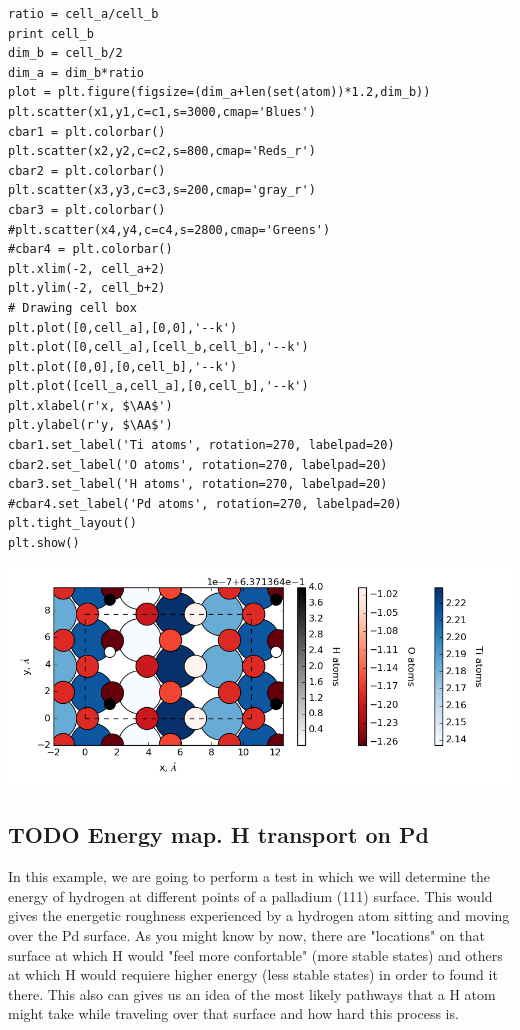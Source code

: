 \documentclass[11pt]{article}
\begin{document}
\begin{verbatim}
ratio = cell_a/cell_b
print cell_b
dim_b = cell_b/2
dim_a = dim_b*ratio
plot = plt.figure(figsize=(dim_a+len(set(atom))*1.2,dim_b))
plt.scatter(x1,y1,c=c1,s=3000,cmap='Blues')
cbar1 = plt.colorbar()
plt.scatter(x2,y2,c=c2,s=800,cmap='Reds_r')
cbar2 = plt.colorbar()
plt.scatter(x3,y3,c=c3,s=200,cmap='gray_r')
cbar3 = plt.colorbar()
#plt.scatter(x4,y4,c=c4,s=2800,cmap='Greens')
#cbar4 = plt.colorbar()
plt.xlim(-2, cell_a+2)
plt.ylim(-2, cell_b+2)
# Drawing cell box
plt.plot([0,cell_a],[0,0],'--k')
plt.plot([0,cell_a],[cell_b,cell_b],'--k')
plt.plot([0,0],[0,cell_b],'--k')
plt.plot([cell_a,cell_a],[0,cell_b],'--k')
plt.xlabel(r'x, $\AA$')
plt.ylabel(r'y, $\AA$')
cbar1.set_label('Ti atoms', rotation=270, labelpad=20)
cbar2.set_label('O atoms', rotation=270, labelpad=20)
cbar3.set_label('H atoms', rotation=270, labelpad=20)
#cbar4.set_label('Pd atoms', rotation=270, labelpad=20)
plt.tight_layout()
plt.show()
\end{verbatim}



\begin{center}
\includegraphics[width=.9\linewidth]{./figures/BADER_h2_anaTiO2_1x2_06.png}
\end{center}
\subsection{{\bfseries\sffamily TODO} Energy map. H transport on Pd}
\label{sec:orgf1c7351}
In this example, we are going to perform a test in which we will determine the energy of hydrogen at different points of a palladium (111) surface. This would gives the energetic roughness experienced by a hydrogen atom sitting and moving over the Pd surface. As you might know by now, there are "locations" on that surface at which H would "feel more confortable" (more stable states) and others at which H would requiere higher energy (less stable states) in order to found it there. This also can gives us an idea of the most likely pathways that a H atom might take while traveling over that surface and how hard this process is. 
\end{document}
